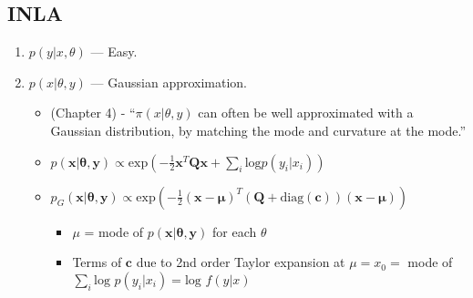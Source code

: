 \documentclass{article}
\begin{document}
\subsection*{INLA}
\begin{enumerate}

\item $p(y|x,\theta)$ --- Easy.

\item $p(x|\theta, y)$ --- Gaussian approximation. \\

\citep{Rue2005}
      \begin{itemize}
      \item  (Chapter 4) - ``$\pi(x|\theta,y)$ can often be well approximated with a Gaussian distribution, by matching the mode and curvature at the mode.''
      \end{itemize}
      
\citep{Rue2007}
      \begin{itemize}
      \item $p(\pmb{x}|\pmb{\theta},\pmb{y}) \propto \text{exp}\left(-\frac{1}{2}\pmb{x}^{T}\pmb{Qx} + \sum_{i} \text{log}p(y_{i}|x_{i}) \right)$ 
      \item $p_{G}(\pmb{x}|\pmb{\theta},\pmb{y}) \propto \text{exp} \left( -\frac{1}{2}(\pmb{x-\mu})^{T} (\pmb{Q} + \text{diag}(\pmb{c}) ) (\pmb{x - \mu}) \right)$
                \begin{itemize}
                \item $\mu$ = mode of $p(\pmb{x}|\pmb{\theta, y})$ for each $\theta$ \citep{Rue2007}
                \item Terms of $\pmb{c}$ due to 2nd order Taylor expansion at $\mu = x_{0} =$ mode of $\sum_{i} \text{log }p(y_{i}|x_{i}) = \text{log }f(y|x)$
                \end{itemize}
      \end{itemize}
      

\end{enumerate}
\end{document}
